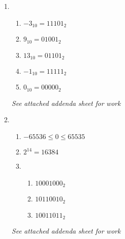 \begin{enumerate}[leftmargin=2cm,labelsep=.5cm,label=\bf\arabic*.]
\item
\begin{enumerate}
  \item $-3_{10} = 11101_2$
  \item $9_{10} = 01001_2$
  \item $13_{10} = 01101_2$
  \item $-1_{10} = 11111_2$
  \item $0_{10} = 00000_2$\\
\end{enumerate}
\textit{See attached addenda sheet for work}\\[5mm]
\item
\begin{enumerate}
  \item $-65536\leq 0 \leq 65535$\\
  \item $2^{14} = 16384$\\
  \item 
    \begin{enumerate}
      \item $10001000_2$
      \item $10110010_2$
      \item $10011011_2$\\
    \end{enumerate}
\end{enumerate}
\textit{See attached addenda sheet for work}
\end{enumerate}
